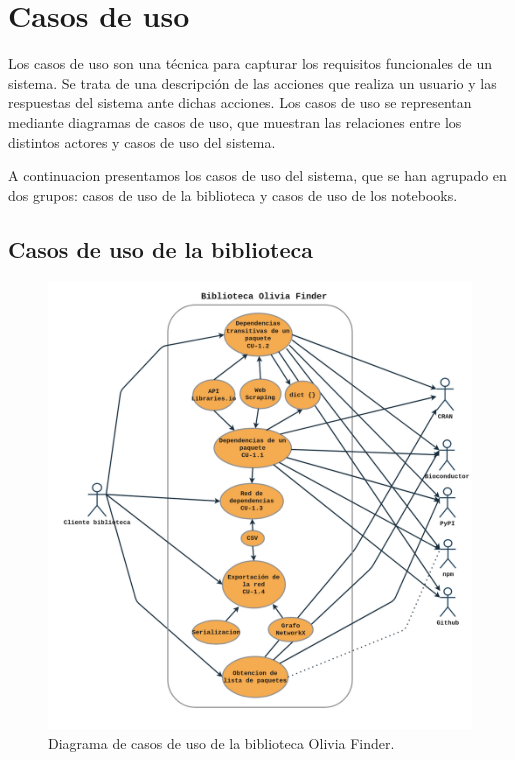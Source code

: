 \section{Casos de uso}

Los casos de uso son una técnica para capturar los requisitos funcionales de un sistema. Se trata de una
descripción de las acciones que realiza un usuario y las respuestas del sistema ante dichas acciones.
Los casos de uso se representan mediante diagramas de casos de uso, que muestran las relaciones entre los distintos actores y casos de uso del sistema.

A continuacion presentamos los casos de uso del sistema, que se han agrupado en dos grupos: casos de uso de la biblioteca y casos de uso de los notebooks.

\subsection{Casos de uso de la biblioteca}

\begin{figure}[ht!]
	\centering
	\includegraphics[width=1\textwidth]{img/anexos/CU_of.png}
	\caption{Diagrama de casos de uso de la biblioteca Olivia Finder.}
	\label{fig:casos_de_uso}
\end{figure}

